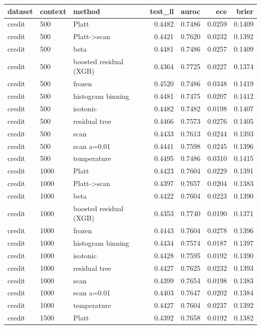 \begin{tabular}{lllrrrr}
\toprule
dataset & context & method & test_ll & auroc & ece & brier \\
\midrule
credit & 500 & Platt & 0.4482 & 0.7486 & 0.0259 & 0.1409 \\
credit & 500 & Platt->scan & 0.4421 & 0.7620 & 0.0232 & 0.1392 \\
credit & 500 & beta & 0.4481 & 0.7486 & 0.0257 & 0.1409 \\
credit & 500 & boosted residual (XGB) & 0.4364 & 0.7725 & 0.0227 & 0.1374 \\
credit & 500 & frozen & 0.4520 & 0.7486 & 0.0348 & 0.1419 \\
credit & 500 & histogram binning & 0.4481 & 0.7475 & 0.0207 & 0.1412 \\
credit & 500 & isotonic & 0.4482 & 0.7482 & 0.0198 & 0.1407 \\
credit & 500 & residual tree & 0.4466 & 0.7573 & 0.0276 & 0.1405 \\
credit & 500 & scan & 0.4433 & 0.7613 & 0.0244 & 0.1393 \\
credit & 500 & scan a=0.01 & 0.4441 & 0.7598 & 0.0245 & 0.1396 \\
credit & 500 & temperature & 0.4495 & 0.7486 & 0.0310 & 0.1415 \\
credit & 1000 & Platt & 0.4423 & 0.7604 & 0.0229 & 0.1391 \\
credit & 1000 & Platt->scan & 0.4397 & 0.7657 & 0.0204 & 0.1383 \\
credit & 1000 & beta & 0.4422 & 0.7604 & 0.0223 & 0.1390 \\
credit & 1000 & boosted residual (XGB) & 0.4353 & 0.7740 & 0.0190 & 0.1371 \\
credit & 1000 & frozen & 0.4443 & 0.7604 & 0.0278 & 0.1396 \\
credit & 1000 & histogram binning & 0.4434 & 0.7574 & 0.0187 & 0.1397 \\
credit & 1000 & isotonic & 0.4428 & 0.7595 & 0.0192 & 0.1390 \\
credit & 1000 & residual tree & 0.4427 & 0.7625 & 0.0232 & 0.1393 \\
credit & 1000 & scan & 0.4399 & 0.7654 & 0.0198 & 0.1383 \\
credit & 1000 & scan a=0.01 & 0.4403 & 0.7647 & 0.0202 & 0.1384 \\
credit & 1000 & temperature & 0.4427 & 0.7604 & 0.0237 & 0.1392 \\
credit & 1500 & Platt & 0.4392 & 0.7658 & 0.0192 & 0.1382 \\

\end{tabular}

